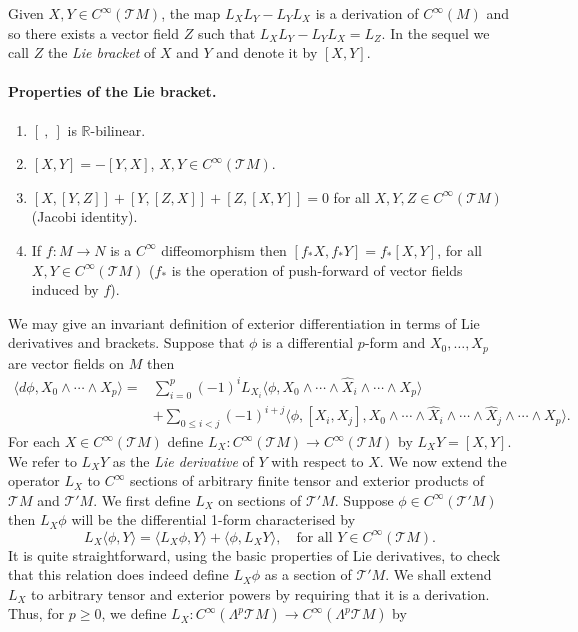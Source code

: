 Given $X,Y\in C^\infty(\mathcal T M)$, the map $L_X L_Y-L_Y L_X$ is a derivation of $C^\infty(M)$ and so there exists a vector field $Z$ such that $L_X L_Y-L_Y L_X=L_Z$. In the sequel we call $Z$ the \emph{Lie bracket} of $X$ and $Y$ and denote it by $[X,Y]$.
\paragraph{Properties of the Lie bracket.}
\begin{enumerate}
\item $[\ ,\ ]$ is $\mathbb R$-bilinear.
\item $[X,Y]=-[Y,X]$, $X,Y\in C^\infty(\mathcal T M)$.
\item $[X,[Y,Z]]+[Y,[Z,X]]+[Z,[X,Y]]=0$ for all $X,Y,Z\in C^\infty(\mathcal T M)$ (Jacobi identity).
\item If $f:M\to N$ is a $C^\infty$ diffeomorphism then $[f_*X,f_*Y]=f_*[X,Y]$, for all $X,Y\in C^\infty(\mathcal T M)$ ($f_*$ is the operation of push-forward of vector fields induced by $f$).
\end{enumerate}
We may give an invariant definition of exterior differentiation in terms of Lie derivatives and brackets. Suppose that $\phi$ is a differential $p$-form and $X_0,\ldots,X_p$ are vector fields on $M$ then
\[
\begin{split}
\langle d\phi,X_0\wedge\cdots\wedge X_p\rangle
={}&\sum_{i=0}^p(-1)^i L_{X_i}\langle\phi,X_0\wedge\cdots\wedge\widehat X_i\wedge\cdots\wedge X_p\rangle\\
&+\sum_{0\leq i<j}(-1)^{i+j}\langle\phi,[X_i,X_j],X_0\wedge\cdots\wedge\widehat X_i\wedge\cdots\wedge\widehat X_j\wedge\cdots\wedge X_p\rangle.
\end{split}
\]
For each $X\in C^\infty(\mathcal T M)$ define $L_X:C^\infty(\mathcal T M)\to C^\infty(\mathcal T M)$ by $L_XY=[X,Y]$. We refer to $L_XY$ as the \emph{Lie derivative} of $Y$ with respect to $X$. We now extend the operator $L_X$ to $C^\infty$ sections of arbitrary finite tensor and exterior products of $\mathcal T M$ and $\mathcal T'M$. We first define $L_X$ on sections of $\mathcal T'M$. Suppose $\phi\in C^\infty(\mathcal T'M)$ then $L_X\phi$ will be the differential 1-form characterised by
\[
L_X\langle\phi,Y\rangle=\langle L_X\phi,Y\rangle+\langle\phi,L_XY\rangle,\quad\text{for all }Y\in C^\infty(\mathcal T M).
\]
It is quite straightforward, using the basic properties of Lie derivatives, to check that this relation does indeed define $L_X\phi$ as a section of $\mathcal T'M$. We shall extend $L_X$ to arbitrary tensor and exterior powers by requiring that it is a derivation. Thus, for $p\geq0$, we define $L_X:C^\infty(\Lambda^p\mathcal T M)\to C^\infty(\Lambda^p\mathcal T M)$ by
